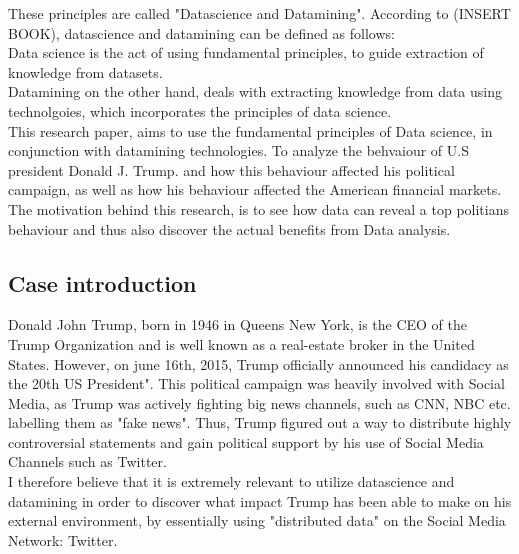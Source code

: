 \documentclass[11pt]{article}
\begin{document}
These principles are called "Datascience and Datamining". According to (INSERT BOOK), datascience and datamining can be defined as follows: \\

Data science is the act of using fundamental principles, to guide extraction of knowledge from datasets. \\

Datamining on the other hand, deals with extracting knowledge from data using technolgoies, which incorporates the principles of data science.  \\

This research paper, aims to use the fundamental principles of Data science, in conjunction with  datamining technologies.  
To analyze the behvaiour of U.S president Donald J. Trump. and how this behaviour affected his political campaign, as well as how his behaviour affected the American financial markets. The motivation behind this research, is to see how data can reveal a top politians behaviour and thus also discover the actual benefits from Data analysis. 









\subsection{Case introduction}
Donald John Trump, born in 1946 in Queens New York, is the CEO of the Trump Organization and is well known as a real-estate broker in the United States.
However, on june 16th, 2015, Trump officially announced his candidacy as the 20th US President". This political campaign was heavily involved with Social Media, as Trump was actively fighting big news channels, such
as CNN, NBC etc. labelling them as "fake news". Thus, Trump figured out a way to distribute highly controversial statements and gain political support by his use of Social Media Channels such as Twitter.\\

I therefore believe that it is extremely relevant to utilize datascience and datamining in order to discover what impact Trump has been able to make on his external environment, by essentially using "distributed data" on the Social Media Network: Twitter. 



\end{document}
